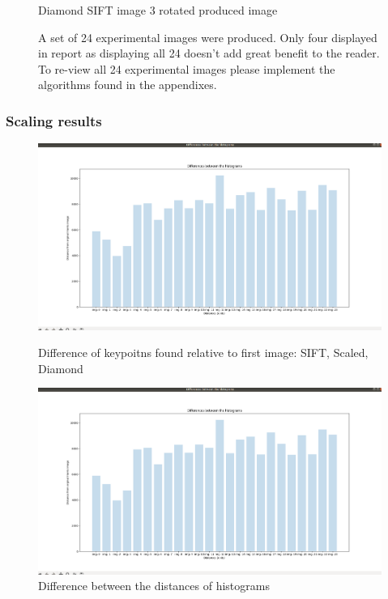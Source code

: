 \documentclass[conference]{IEEEtran}
\begin{document}
\begin{figure}[!htb]
\begin{minipage}[b]{0.2\textwidth}
    \caption{Diamond SIFT image 3 rotated produced image}
    \label{Diamond SIFT image 3 rotated produced image}
  \end{minipage}
  {\caption*{A set of 24 experimental images were produced. Only four displayed in report as displaying all 24 doesn't add great benefit to the reader. To re-view all 24 experimental images please implement the algorithms found in the appendixes.}}
\end{figure}

\subsubsection{Scaling results}

\begin{figure}[!htb]
  \centering
  \begin{minipage}[t]{0.45\textwidth}
    \includegraphics[width=\textwidth]{../programme/results/Task_1/scaled_experiements/SIFT/diamond/diff_hists.png}
    \caption{Difference of keypoitns found relative to first image: SIFT, Scaled, Diamond}
    \label{Difference of keypoints found relative to first image: SIFT, Scaled, Diamond}
  \end{minipage}
  \hfill
  \begin{minipage}[t]{0.45\textwidth}
    \includegraphics[width=\textwidth]{../programme/results/Task_1/scaled_experiements/SIFT/diamond/diff_hists.png}
    \caption{Difference between the distances of histograms}
    \label{Difference between the distances of histograms: SIFT, scaled, Diamond}
  \end{minipage}
\end{figure}
\end{document}
